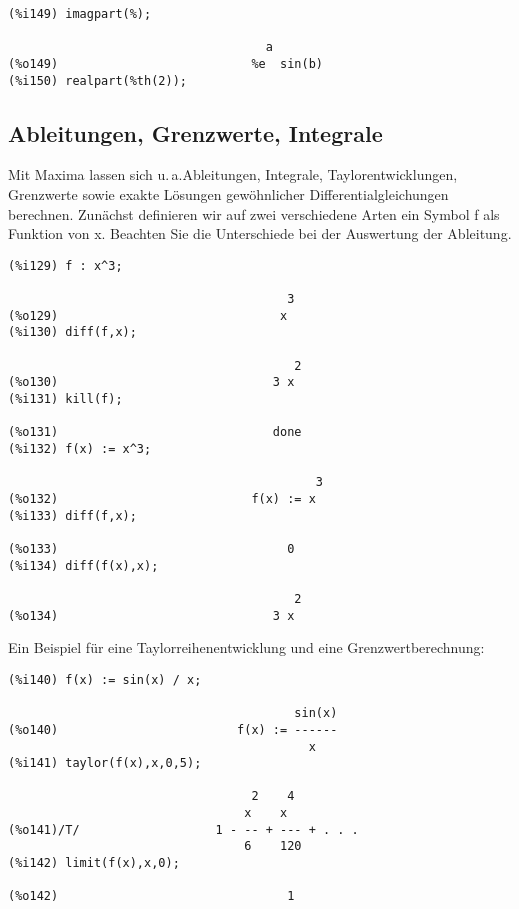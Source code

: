 \documentclass[12pt]{scrartcl}
\newcommand*\ua{u.\,a.\xspace}
\begin{document}
\begin{verbatim}
(%i149) imagpart(%);

                                    a
(%o149)                           %e  sin(b)
(%i150) realpart(%th(2));
\end{verbatim}

\subsection{Ableitungen, Grenzwerte, Integrale}

Mit Maxima lassen sich \ua\@ Ableitungen, Integrale,
Taylorentwicklungen, Grenzwerte sowie exakte Lösungen gewöhnlicher
Differentialgleichungen berechnen.
Zunächst definieren wir auf zwei verschiedene Arten ein Symbol f als
Funktion von x. Beachten Sie die Unterschiede bei der Auswertung der
Ableitung.

\begin{verbatim}
(%i129) f : x^3;

                                       3
(%o129)                               x
(%i130) diff(f,x);

                                        2
(%o130)                              3 x
(%i131) kill(f);

(%o131)                              done
(%i132) f(x) := x^3;

                                           3
(%o132)                           f(x) := x
(%i133) diff(f,x);

(%o133)                                0
(%i134) diff(f(x),x);

                                        2
(%o134)                              3 x
\end{verbatim}

Ein Beispiel für eine Taylorreihenentwicklung und eine Grenzwertberechnung:

\begin{verbatim}
(%i140) f(x) := sin(x) / x;

                                        sin(x)
(%o140)                         f(x) := ------
                                          x
(%i141) taylor(f(x),x,0,5);

                                  2    4
                                 x    x
(%o141)/T/                   1 - -- + --- + . . .
                                 6    120
(%i142) limit(f(x),x,0);

(%o142)                                1
\end{verbatim}
\end{document}

